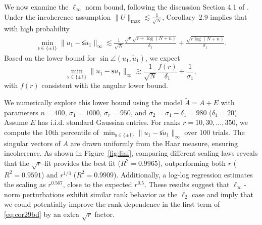 \documentclass[reqno]{amsart}
\theoremstyle{plain}
\theoremstyle{definition}
\begin{document}
We now examine the \(\ell_\infty\) norm bound, following the discussion Section 4.1 of \cite{Wang24}. Under the incoherence assumption $\|U\|_{\max} \lesssim \frac{1}{\sqrt N}$,  Corollary~2.9 implies that with high probability
\begin{align}\label{eq:cor29bd}
\min_{\mathsf{s}\in\{\pm 1\}}\| u_1- \mathsf{s}\widetilde{u}_1\|_{\infty} \lesssim  \frac{1}{\sqrt N}\frac{\sqrt{r}\sqrt{r +\log(N+n)}}{\delta_1} + \frac{\sqrt{r\log(N+n)}}{\sigma_1}.
\end{align}
 Based on the lower bound for $\sin \angle(u_1, \widetilde{u}_1)$, we expect 
\[ \min_{\mathsf{s}\in\{\pm 1\}}\| u_1- \mathsf{s}\widetilde{u}_1\|_{\infty}\gtrsim \frac{1}{\sqrt N} \frac{f(r)}{\delta_1} + \frac{1}{\sigma_1},\]
with $f(r)$ consistent with the angular lower bound.

We numerically explore this lower bound using the model $\widetilde{A}=A + E$ with parameters $n = 400$, $\sigma_1 = 1000$, $\sigma_r = 950$, and $\sigma_2 = \sigma_1 - \delta_1 = 980$ ($\delta_1 = 20$). Assume $E$ has i.i.d. standard Gaussian entries.  For ranks $r = 10, 30, \ldots, 350$, we compute the 10th percentile of \(\min_{\mathsf{s}\in\{\pm 1\}} \| u_1 - \mathsf{s} \widetilde{u}_1 \|_\infty\) over 100 trials. The singular vectors of $A$ are drawn uniformly from the Haar measure, ensuring incoherence. As shown in Figure~\ref{fig:linf}, comparing different scaling laws reveals that the $\sqrt{r}$-fit provides the best fit ($R^2 = 0.9965$), outperforming both $r$ ($R^2 = 0.9591$) and $r^{1/3}$ ($R^2 = 0.9909$). Additionally, a log-log regression estimates the scaling as $r^{0.567}$, close to the expected $r^{0.5}$. These results suggest that $\ell_{\infty}$-norm perturbations exhibit similar rank behavior as the $\ell_2$ case and imply that we could potentially improve the rank dependence in the first term of \eqref{eq:cor29bd} by an extra $\sqrt{r}$ factor.


\end{document}
